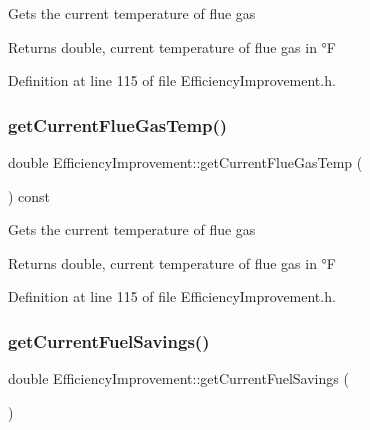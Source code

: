 Gets the current temperature of flue gas

\begin{DoxyReturn}{Returns}
double, current temperature of flue gas in °F 
\end{DoxyReturn}


Definition at line 115 of file Efficiency\+Improvement.\+h.

\mbox{\label{class_efficiency_improvement_a27e97b5c7aad8aa6b4d02e18354d2292}} 
\subsubsection{\texorpdfstring{get\+Current\+Flue\+Gas\+Temp()}{getCurrentFlueGasTemp()}\hspace{0.1cm}{\footnotesize\ttfamily [3/3]}}
{\footnotesize\ttfamily double Efficiency\+Improvement\+::get\+Current\+Flue\+Gas\+Temp (\begin{DoxyParamCaption}{ }\end{DoxyParamCaption}) const\hspace{0.3cm}{\ttfamily [inline]}}

Gets the current temperature of flue gas

\begin{DoxyReturn}{Returns}
double, current temperature of flue gas in °F 
\end{DoxyReturn}


Definition at line 115 of file Efficiency\+Improvement.\+h.

\mbox{\label{class_efficiency_improvement_ab2e940be7192df960c9eb9578096796f}} 
\subsubsection{\texorpdfstring{get\+Current\+Fuel\+Savings()}{getCurrentFuelSavings()}\hspace{0.1cm}{\footnotesize\ttfamily [1/3]}}
{\footnotesize\ttfamily double Efficiency\+Improvement\+::get\+Current\+Fuel\+Savings (\begin{DoxyParamCaption}{ }\end{DoxyParamCaption})\hspace{0.3cm}{\ttfamily [inline]}}

